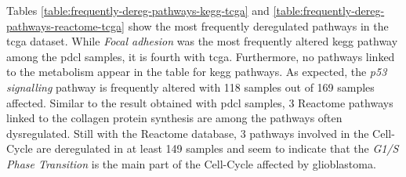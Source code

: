 Tables \ref*{table:frequently-dereg-pathways-kegg-tcga} and \ref*{table:frequently-dereg-pathways-reactome-tcga} show the most frequently deregulated pathways in the \acrshort{tcga} dataset.
While \textit{Focal adhesion} was the most frequently altered \acrshort{kegg} pathway among the \acrshort{pdcl} samples, it is fourth with \acrshort{tcga}.
Furthermore, no pathways linked to the metabolism appear in the table for \acrshort{kegg} pathways.
As expected, the \textit{p53 signalling} pathway is frequently altered with 118 samples out of 169 samples affected.
Similar to the result obtained with \acrshort{pdcl} samples, 3 Reactome pathways linked to the collagen protein synthesis are among the pathways often dysregulated.
Still with the Reactome database, 3 pathways involved in the Cell-Cycle are deregulated in at least 149 samples and seem to indicate that the \textit{G1/S Phase Transition} is the main part of the Cell-Cycle affected by glioblastoma.

